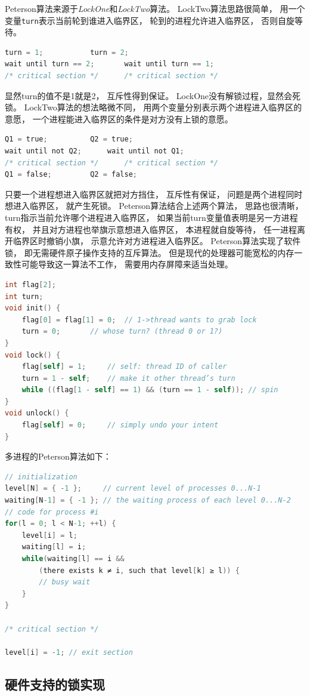\documentclass[11pt]{article}
\begin{document}
Peterson算法来源于{\em LockOne}和{\em LockTwo}算法。
LockTwo算法思路很简单，
用一个变量\verb|turn|表示当前轮到谁进入临界区，
轮到的进程允许进入临界区，
否则自旋等待。
\begin{lstlisting}[language=C]
turn = 1;			turn = 2;
wait until turn == 2;		wait until turn == 1;
/* critical section */		/* critical section */
  \end{lstlisting}
显然turn的值不是1就是2，
互斥性得到保证。
LockOne没有解锁过程，显然会死锁。
LockTwo算法的想法略微不同，
用两个变量分别表示两个进程进入临界区的意愿，
一个进程能进入临界区的条件是对方没有上锁的意愿。
\begin{lstlisting}[language=C]
Q1 = true;			Q2 = true;
wait until not Q2;		wait until not Q1;
/* critical section */		/* critical section */
Q1 = false;			Q2 = false;
\end{lstlisting}
只要一个进程想进入临界区就把对方挡住，
互斥性有保证，
问题是两个进程同时想进入临界区，
就产生死锁。
Peterson算法结合上述两个算法，
思路也很清晰，
turn指示当前允许哪个进程进入临界区，
如果当前turn变量值表明是另一方进程有权，
并且对方进程也举旗示意想进入临界区，
本进程就自旋等待，
任一进程离开临界区时撤销小旗，
示意允许对方进程进入临界区。
Peterson算法实现了软件锁，
即无需硬件原子操作支持的互斥算法。
但是现代的处理器可能宽松的内存一致性可能导致这一算法不工作，
需要用内存屏障来适当处理。
\begin{lstlisting}[language=C]
int flag[2];
int turn;
void init() {
	flag[0] = flag[1] = 0;	// 1->thread wants to grab lock
	turn = 0;		// whose turn? (thread 0 or 1?)
}
void lock() {
	flag[self] = 1;		// self: thread ID of caller
	turn = 1 - self;	// make it other thread’s turn
	while ((flag[1 - self] == 1) && (turn == 1 - self)); // spin
}
void unlock() {
	flag[self] = 0;		// simply undo your intent
}
\end{lstlisting}

多进程的Peterson算法如下：
\begin{lstlisting}[language=C]
// initialization
level[N] = { -1 };     // current level of processes 0...N-1
waiting[N-1] = { -1 }; // the waiting process of each level 0...N-2
// code for process #i
for(l = 0; l < N-1; ++l) {
	level[i] = l;
	waiting[l] = i;
	while(waiting[l] == i &&
		(there exists k ≠ i, such that level[k] ≥ l)) {
		// busy wait
	}
}

/* critical section */

level[i] = -1; // exit section
\end{lstlisting}

\subsection{硬件支持的锁实现}
\end{document}
